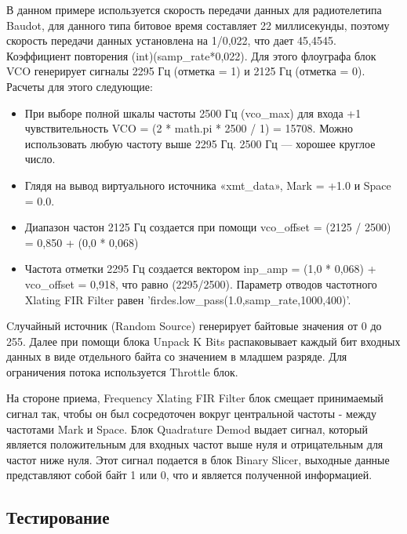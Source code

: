В данном примере используется скорость передачи данных для радиотелетипа Baudot, для данного типа битовое время составляет 22 миллисекунды, поэтому скорость передачи данных установлена на 1/0,022, что дает 45,4545. Коэффициент повторения (int)(samp\_rate*0,022). Для этого флоуграфа блок VCO генерирует сигналы 2295 Гц (отметка = 1) и 2125 Гц (отметка = 0). Расчеты для этого следующие:
\begin{itemize}
\item При выборе полной шкалы частоты 2500 Гц (vco\_max) для входа +1 чувствительность VCO = (2 * math.pi * 2500 / 1) = 15708. Можно использовать любую частоту выше 2295 Гц. 2500 Гц — хорошее круглое число. 
\item Глядя на вывод виртуального источника «xmt\_data», Mark = +1.0 и Space = 0.0. 
\item Диапазон частон 2125 Гц создается при помощи vco\_offset = (2125 / 2500) = 0,850 + (0,0 * 0,068)
\item Частота отметки 2295 Гц создается вектором inp\_amp = (1,0 * 0,068) + vco\_offset = 0,918, что равно (2295/2500). Параметр отводов частотного Xlating FIR Filter равен 'firdes.low\_pass(1.0,samp\_rate,1000,400)'.
\end{itemize}

Cлучайный источник (Random Source) генерирует байтовые значения от 0 до 255. Далее при помощи блока Unpack K Bits распаковывает каждый бит входных данных в виде отдельного байта со значением в младшем разряде. Для ограничения потока используется Throttle блок.

На стороне приема, Frequency Xlating FIR Filter блок смещает принимаемый сигнал так, чтобы он был сосредоточен вокруг центральной частоты - между частотами Mark и Space. Блок Quadrature Demod выдает сигнал, который является положительным для входных частот выше нуля и отрицательным для частот ниже нуля. Этот сигнал подается в блок Binary Slicer, выходные данные представляют собой байт 1 или 0, что и является полученной информацией.

\subsection{Тестирование}

